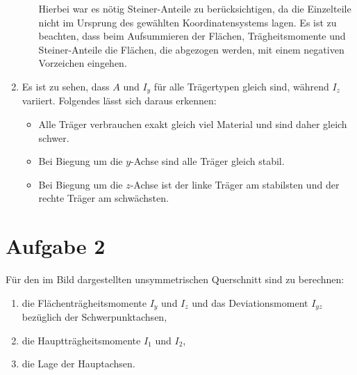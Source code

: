 \documentclass{exercise}
\begin{document}
\begin{enumerate}
\begin{enumerate}
\[            \]
            Hierbei war es nötig Steiner-Anteile zu berücksichtigen, da die Einzelteile nicht im Ursprung des gewählten Koordinatensystems lagen.
            Es ist zu beachten, dass beim Aufsummieren der Flächen, Trägheitsmomente und Steiner-Anteile die Flächen, die abgezogen werden, mit einem negativen Vorzeichen eingehen.
        \end{enumerate}
        \item Es ist zu sehen, dass \(A\) und \(I_y\) für alle Trägertypen gleich sind, während \(I_z\) variiert.
        Folgendes lässt sich daraus erkennen:
        \begin{itemize}
            \item Alle Träger verbrauchen exakt gleich viel Material und sind daher gleich schwer.
            \item Bei Biegung um die \(y\)-Achse sind alle Träger gleich stabil.
            \item Bei Biegung um die \(z\)-Achse ist der linke Träger am stabilsten und der rechte Träger am schwächsten.
        \end{itemize}
    \end{enumerate}


    \section*{Aufgabe 2}

    \begin{problem}
        Für den im Bild dargestellten unsymmetrischen Querschnitt sind zu berechnen:
        \begin{enumerate}
            \item die Flächenträgheitsmomente \(I_y\) und \(I_z\) und das Deviationsmoment \(I_{yz}\) bezüglich der Schwerpunktachsen,
            \item die Hauptträgheitsmomente \(I_1\) und \(I_2\),
            \item die Lage der Hauptachsen.
        \end{enumerate}
        \begin{center}
        \end{center}
    \end{problem}
\end{document}
